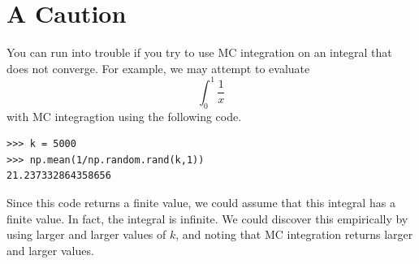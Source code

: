 \section*{A Caution}
You can run into trouble if you try to use MC integration on an integral that does not converge.
For example, we may attempt to evaluate
\[
\int_0^1 \frac{1}{x}
\]
with MC integragtion using the following code.
\begin{lstlisting}
>>> k = 5000
>>> np.mean(1/np.random.rand(k,1))
21.237332864358656
\end{lstlisting}

Since this code returns a finite value, we could assume that this integral has a finite value.
In fact, the integral is infinite.
We could discover this empirically by using larger and larger values of $k$, and noting that MC integration returns larger and larger values.

